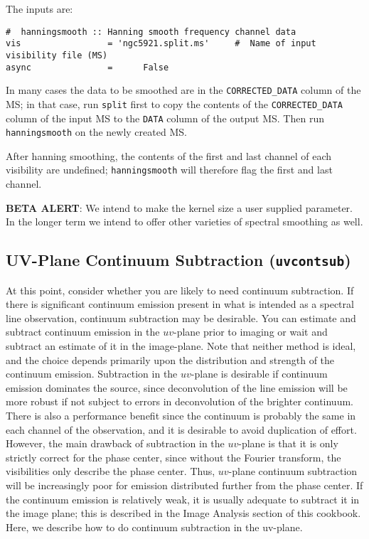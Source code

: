 The inputs are:

\small
\begin{verbatim}
#  hanningsmooth :: Hanning smooth frequency channel data
vis                 = 'ngc5921.split.ms'     #  Name of input visibility file (MS)
async               =      False        
\end{verbatim}
\normalsize

In many cases the data to be smoothed are in the {\tt CORRECTED\_DATA}
column of the MS; in that case, run {\tt split} first to copy the
contents of the {\tt CORRECTED\_DATA} column of the input MS to the
{\tt DATA} column of the output MS.  Then run {\tt hanningsmooth} on
the newly created MS.

After hanning smoothing, the contents of the first and last channel of
each visibility are undefined; {\tt hanningsmooth} will therefore flag
the first and last channel.

{\bf BETA ALERT}: We intend to make the kernel size a user supplied
parameter.  In the longer term we intend to offer other varieties of
spectral smoothing as well.

\subsection{UV-Plane Continuum Subtraction ({\tt uvcontsub})}
\label{section:cal.other.uvcontsub}

At this point, consider whether you are likely to need continuum
subtraction.  If there is significant continuum emission present in
what is intended as a spectral line observation, continuum subtraction
may be desirable.  You can estimate and subtract continuum emission in
the $uv$-plane prior to imaging or wait and subtract an estimate of it
in the image-plane.  Note that neither method is ideal, and the choice
depends primarily upon the distribution and strength of the continuum
emission.  Subtraction in the $uv$-plane is desirable if continuum
emission dominates the source, since deconvolution of the line
emission will be more robust if not subject to errors in deconvolution
of the brighter continuum.  There is also a performance benefit since
the continuum is probably the same in each channel of the observation,
and it is desirable to avoid duplication of effort.  However, the main
drawback of subtraction in the $uv$-plane is that it is only strictly
correct for the phase center, since without the Fourier transform, the
visibilities only describe the phase center.  Thus, $uv$-plane continuum
subtraction will be increasingly poor for emission distributed further
from the phase center.  If the continuum emission is relatively weak,
it is usually adequate to subtract it in the image plane; this is
described in the Image Analysis section of this cookbook.  Here, we
describe how to do continuum subtraction in the uv-plane.


